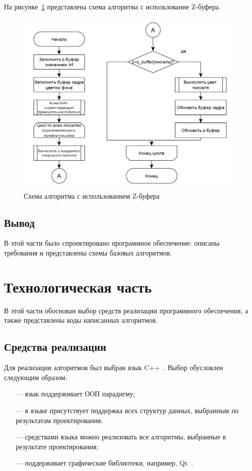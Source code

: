 \documentclass[a4paper, 14pt]{extreport}
\begin{document}
На рисунке~\ref{constr:z} представлена схема алгоритма с использование Z-буфера.

\begin{figure}[h]
	\centering
	\includegraphics[scale=0.8]{tools/alg_z.png}
	\caption{Схема алгоритма с использованием Z-буфера}
	\label{constr:z}
\end{figure}

\section{Вывод}

В этой части было спроектировано программное обеспечение: описаны требования и представлены схемы базовых 
алгоритмов.

\chapter{Технологическая часть}

В этой части обоснован выбор средств реализации программного обеспечения, а также представлены коды написанных
алгоритмов.

\section{Средства реализации}

Для реализации алгоритмов был выбран язык C++~\cite{c++}. Выбор обусловлен следующим образом:
\begin{itemize}
	\item[---] язык поддерживает ООП парадигму;
	\item[---] в языке присутствует поддержка всех структур данных, выбранным по результатам проектирования;
	\item[---] средствами языка можно реализовать все алгоритмы, выбранные в результате проектирования;
	\item[---] поддерживает графические библиотеки, например, Qt~\cite{qt}.
\end{itemize}
\end{document}
